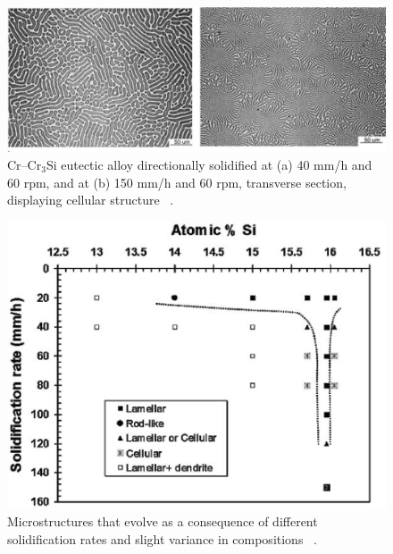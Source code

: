 %
\begin{figure}
\begin{center}
\includegraphics[width=16cm]{DS_Cr-Cr3Si_bad}
\caption{Cr--Cr$_3$Si eutectic alloy directionally solidified at (a) 40 mm/h and 60 rpm, and at (b) 150 mm/h and 60 rpm, transverse section, displaying cellular structure ~\cite{bei03}.}
\label{fig:degenerate}
\end{center}
\end{figure}
%
\begin{figure}[H]
\begin{center}
\includegraphics[width=14cm]{funnel}
\caption{Microstructures that evolve as a consequence of different solidification rates and slight variance in compositions ~\cite{bei03a}.}
\label{fig:funnel}
\end{center}
\end{figure}
%

